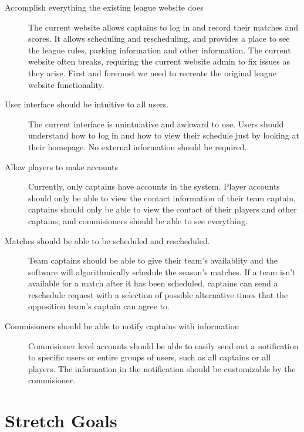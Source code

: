 \documentclass{article}
\begin{document}
\begin{description}
    \item [Accomplish everything the existing league website does]
    The current website allows captains to log in and record their matches
    and scores. It allows scheduling and rescheduling, and provides a place
    to see the league rules, parking information and other information. The
    current website often breaks, requiring the current website admin to fix
    issues as they arise. First and foremost we need to recreate the original
    league website functionality.
    \item [User interface should be intuitive to all users.] The current
    interface is unintuiative and awkward to use. Users should understand
    how to log in and how to view their schedule just by looking at their
    homepage. No external information should be required.
    \item [Allow players to make accounts] Currently, only captains have
    accounts in the system. Player accounts should only be able to view the
    contact information of their team captain, captains should only be able
    to view the contact of their players and other captains, and commisioners
    should be able to see everything.
    \item [Matches should be able to be scheduled and rescheduled.] 
    Team captains should be able to give their team's availablity and the
    software will algorithmically schedule the season's matches. If a team
    isn't available for a match after it has been scheduled, captains can
    send a reschedule request with a selection of possible alternative times
    that the opposition team's captain can agree to.
    \item [Commisioners should be able to notify captains with information]
    Commisioner level accounts should be able to easily send out a
    notification to specific users or entire groups of users, such as all
    captains or all players. The information in the notification should be
    customizable by the commisioner.
\end{description}

\section{Stretch Goals}
\end{document}
